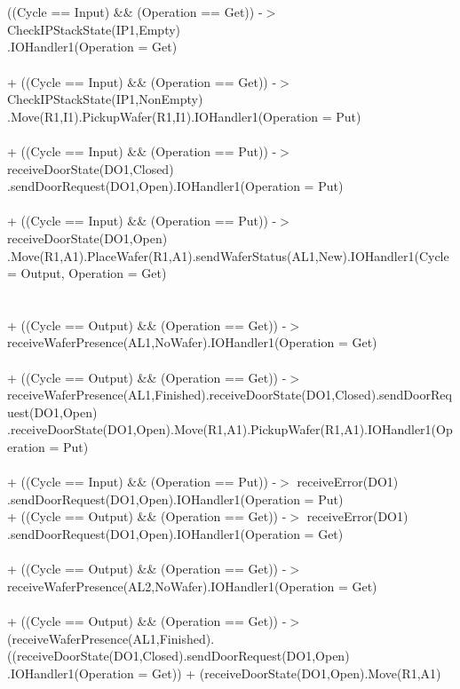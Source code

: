\documentclass[a4paper,12pt]{article}
\begin{document}
	\\
	\\((Cycle == Input) \&\& (Operation == Get)) -$>$ CheckIPStackState(IP1,Empty)
	\\.IOHandler1(Operation = Get)
	\\
	\\+ ((Cycle == Input) \&\& (Operation == Get)) -$>$ CheckIPStackState(IP1,NonEmpty)
	\\.Move(R1,I1).PickupWafer(R1,I1).IOHandler1(Operation = Put)
	\\
	\\+ ((Cycle == Input) \&\& (Operation == Put)) -$>$ receiveDoorState(DO1,Closed)
	\\.sendDoorRequest(DO1,Open).IOHandler1(Operation = Put)
	\\
	\\+ ((Cycle == Input) \&\& (Operation == Put)) -$>$ receiveDoorState(DO1,Open)
	\\.Move(R1,A1).PlaceWafer(R1,A1).sendWaferStatus(AL1,New).IOHandler1(Cycle = Output, Operation = Get)
	\\
	\\
	\\+ ((Cycle == Output) \&\& (Operation == Get)) -$>$ receiveWaferPresence(AL1,NoWafer).IOHandler1(Operation = Get)
	\\
	\\+ ((Cycle == Output) \&\& (Operation == Get)) -$>$ receiveWaferPresence(AL1,Finished).receiveDoorState(DO1,Closed).sendDoorRequest(DO1,Open)
	.receiveDoorState(DO1,Open).Move(R1,A1).PickupWafer(R1,A1).IOHandler1(Operation = Put)
	\\
	\\+ ((Cycle == Input) \&\& (Operation == Put)) -$>$ receiveError(DO1)
	\\.sendDoorRequest(DO1,Open).IOHandler1(Operation = Put)
	\\+ ((Cycle == Output) \&\& (Operation == Get)) -$>$ receiveError(DO1)
	\\.sendDoorRequest(DO1,Open).IOHandler1(Operation = Get)
	\\
	\\+ ((Cycle == Output) \&\& (Operation == Get)) -$>$ receiveWaferPresence(AL2,NoWafer).IOHandler1(Operation = Get)
	\\
	\\+ ((Cycle == Output) \&\& (Operation == Get)) -$>$ (receiveWaferPresence(AL1,Finished).((receiveDoorState(DO1,Closed).sendDoorRequest(DO1,Open)
	\\.IOHandler1(Operation = Get)) + (receiveDoorState(DO1,Open).Move(R1,A1)
\end{document}
